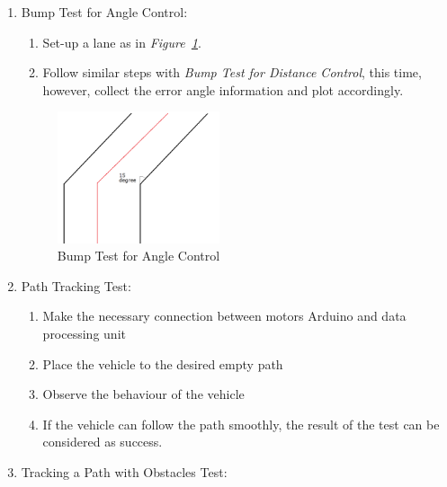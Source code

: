 \documentclass[a4paper,12pt]{article}
\begin{document}
\begin{enumerate}
\begin{enumerate}
\item Bump Test for Angle Control: \label{test:c}	

\begin{enumerate}

\item Set-up a lane as in \textit{Figure~\ref{fig:bump-ang}}.

\item Follow similar steps with \textit{Bump Test for Distance Control}, this time, however, collect the error angle information and plot accordingly.


\end{enumerate}


\begin{figure}[h]

\includegraphics[width=0.45\textwidth,center]{images/bump_test_ang}

\caption{Bump Test for Angle Control \label{fig:bump-ang} }

\end{figure}		


\item Path Tracking Test: \label{test:d}	

\begin{enumerate}

\item Make the necessary connection between motors Arduino and data processing unit  

\item Place the vehicle to the desired empty path   

\item Observe the behaviour of the vehicle  

\item If the vehicle can follow the path smoothly, the result of the test can be considered as success.  

\end{enumerate}



\item Tracking a Path with Obstacles Test:	\label{test:e}	


\end{enumerate}
\end{enumerate}
\end{document}
